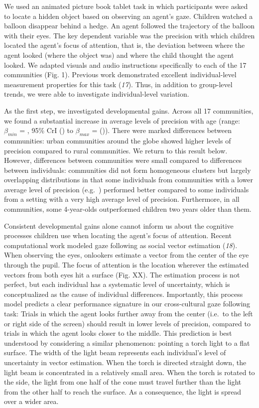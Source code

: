 \documentclass[
  man,floatsintext]{apa6}
\begin{document}
We used an animated picture book tablet task in which participants were asked to locate a hidden object based on observing an agent's gaze. Children watched a balloon disappear behind a hedge. An agent followed the trajectory of the balloon with their eyes. The key dependent variable was the precision with which children located the agent's focus of attention, that is, the deviation between where the agent looked (where the object was) and where the child thought the agent looked. We adapted visuals and audio instructions specifically to each of the 17 communities (Fig. 1). Previous work demonstrated excellent individual-level measurement properties for this task (\emph{17}). Thus, in addition to group-level trends, we were able to investigate individual-level variation.

As the first step, we investigated developmental gains. Across all 17 communities, we found a substantial increase in average levels of precision with age (range: \(\beta_{min}\) = , 95\% CrI () to \(\beta_{max}\) = ()). There were marked differences between communities: urban communities around the globe showed higher levels of precision compared to rural communities. We return to this result below. However, differences between communities were small compared to differences between individuals: communities did not form homogeneous clusters but largely overlapping distributions in that some individuals from communities with a lower average level of precision (e.g.~) performed better compared to some individuals from a setting with a very high average level of precision. Furthermore, in all communities, some 4-year-olds outperformed children two years older than them.

Consistent developmental gains alone cannot inform us about the cognitive processes children use when locating the agent's focus of attention. Recent computational work modeled gaze following as social vector estimation (\emph{18}). When observing the eyes, onlookers estimate a vector from the center of the eye through the pupil. The focus of attention is the location wherever the estimated vectors from both eyes hit a surface (Fig. XX). The estimation process is not perfect, but each individual has a systematic level of uncertainty, which is conceptualized as the cause of individual differences. Importantly, this process model predicts a clear performance signature in our cross-cultural gaze following task: Trials in which the agent looks further away from the center (i.e.~to the left or right side of the screen) should result in lower levels of precision, compared to trials in which the agent looks closer to the middle. This prediction is best understood by considering a similar phenomenon: pointing a torch light to a flat surface. The width of the light beam represents each individual's level of uncertainty in vector estimation. When the torch is directed straight down, the light beam is concentrated in a relatively small area. When the torch is rotated to the side, the light from one half of the cone must travel further than the light from the other half to reach the surface. As a consequence, the light is spread over a wider area.
\end{document}
